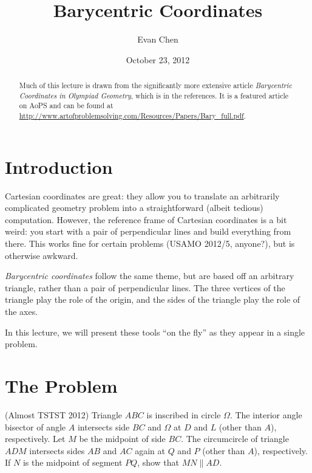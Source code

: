 \documentclass{scrartcl}
\begin{document}
\title{Barycentric Coordinates}
\author{Evan Chen }
\date{October 23, 2012}

\maketitle

\begin{abstract}
  \noindent \footnotesize Much of this lecture is drawn from the significantly more extensive article \textit{Barycentric Coordinates in Olympiad Geometry}, which is \cite{bary} in the references.  It is a featured article on AoPS and can be found at \\ \url{http://www.artofproblemsolving.com/Resources/Papers/Bary_full.pdf}.
\end{abstract}

\section{Introduction}
Cartesian coordinates are great: they allow you to translate an arbitrarily complicated geometry problem into a straightforward (albeit tedious) computation.  However, the reference frame of Cartesian coordinates is a bit weird: you start with a pair of perpendicular lines and build everything from there.  This works fine for certain problems (USAMO 2012/5, anyone?), but is otherwise awkward.

\textit{Barycentric coordinates} follow the same theme, but are based off an arbitrary triangle, rather than a pair of perpendicular lines.  The three vertices of the triangle play the role of the origin, and the sides of the triangle play the role of the axes.

In this lecture, we will present these tools ``on the fly'' as they appear in a single problem.

\section{The Problem}
(Almost TSTST 2012) Triangle $ABC$ is inscribed in circle $\Omega$.  The interior angle bisector of angle $A$ intersects side $BC$ and $\Omega$ at $D$ and $L$ (other than $A$), respectively.  Let $M$ be the midpoint of side $BC$.  The circumcircle of triangle $ADM$ intersects sides $AB$ and $AC$ again at $Q$ and $P$ (other than $A$), respectively.  If $N$ is the midpoint of segment $PQ$, show that $MN \parallel AD$.  %
\end{document}
